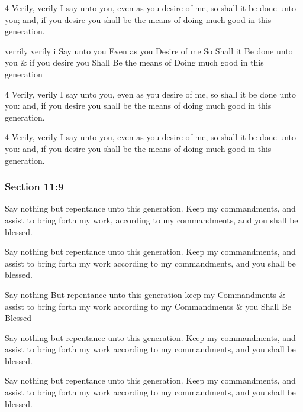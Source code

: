 		\begin{framed}
		\scriptsize
			\begin{compactdesc}
				\item[JSP] 4 Verily, verily I say unto you, even as you desire of me, so shall it be done unto you; and, if you desire you shall be the means of doing much good in this generation.
				\item[HS] verrily verily i Say unto you Even as you Desire of me So Shall it Be done unto you \& if you desire you Shall Be the means of Doing much good in this generation 
				\item[DC 1835] 4 Verily, verily I say unto you, even as you desire of me, so shall it be done unto you: and, if you desire you shall be the means of doing much good in this generation. 
				\item[DC 1844] 4 Verily, verily I say unto you, even as you desire of me, so shall it be done unto you: and, if you desire you shall be the means of doing much good in this generation. 
			\end{compactdesc}
		\end{framed}

	\subsubsection{Section 11:9} %
		\label{DC11-9}

		Say nothing but repentance unto this generation.  Keep my commandments, and assist to bring forth my work, according to my commandments, and you shall be blessed.

		\begin{framed}
		\scriptsize
			\begin{compactdesc}
				\item[JSP] Say nothing but repentance unto this generation. Keep my commandments, and assist to bring forth my work according to my commandments, and you shall be blessed.
				\item[HS] Say nothing But repentance unto this generation keep my Commandments \& assist to bring forth my work according to my Commandments \& you Shall Be Blessed 
				\item[DC 1835] Say nothing but repentance unto this generation. Keep my commandments, and assist to bring forth my work according to my commandments, and you shall be blessed.
				\item[DC 1844] Say nothing but repentance unto this generation. Keep my commandments, and assist to bring forth my work according to my commandments, and you shall be blessed.
			\end{compactdesc}
		\end{framed}

